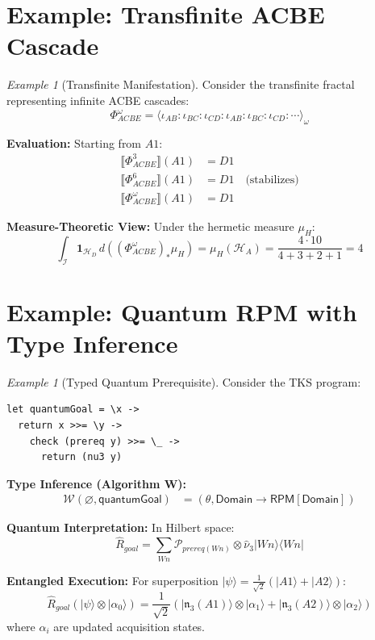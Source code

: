 \documentclass[11pt,twoside,openright]{book}
\theoremstyle{definition}
\theoremstyle{plain}
\theoremstyle{remark}
\newtheorem{example}[definition]{Example}
\newcommand{\sem}[1]{\llbracket #1 \rrbracket}
\newcommand{\Ideas}{\mathcal{I}}
\newcommand{\Hspace}{\mathcal{H}}
\newcommand{\qket}[1]{|#1\rangle}
\newcommand{\qbra}[1]{\langle #1|}
\newcommand{\qop}[1]{\hat{#1}}
\newcommand{\TransFrac}[1]{\Phi^{#1}}        %
\newcommand{\intI}{\int_{\Ideas}}            %
\newcommand{\Subst}{\theta}                  %
\newcommand{\AlgW}{\mathcal{W}}              %
\newcommand{\Projector}{\mathcal{P}}         %
\begin{document}
\section{Example: Transfinite ACBE Cascade}

\begin{example}[Transfinite Manifestation]
\label{ex:transfinite-manifest}
Consider the transfinite fractal representing infinite ACBE cascades:
\[
\TransFrac{\omega}_{ACBE} = \langle \iota_{AB} : \iota_{BC} : \iota_{CD} : \iota_{AB} : \iota_{BC} : \iota_{CD} : \cdots \rangle_\omega
\]

\textbf{Evaluation:} Starting from $A1$:
\begin{align}
\sem{\TransFrac{3}_{ACBE}}(A1) &= D1 \\
\sem{\TransFrac{6}_{ACBE}}(A1) &= D1 \quad \text{(stabilizes)} \\
\sem{\TransFrac{\omega}_{ACBE}}(A1) &= D1
\end{align}

\textbf{Measure-Theoretic View:} Under the hermetic measure $\mu_H$:
\[
\intI \mathbf{1}_{\Hspace_D} \, d((\TransFrac{\omega}_{ACBE})_* \mu_H) = \mu_H(\Hspace_A) = \frac{4 \cdot 10}{4 + 3 + 2 + 1} = 4
\]
\end{example}

\section{Example: Quantum RPM with Type Inference}

\begin{example}[Typed Quantum Prerequisite]
\label{ex:typed-quantum-rpm}
Consider the TKS program:
\begin{verbatim}
let quantumGoal = \x ->
  return x >>= \y ->
    check (prereq y) >>= \_ ->
      return (nu3 y)
\end{verbatim}

\textbf{Type Inference (Algorithm W):}
\begin{align}
\AlgW(\varnothing, \mathsf{quantumGoal}) &= (\Subst, \mathsf{Domain} \to \mathsf{RPM}[\mathsf{Domain}])
\end{align}

\textbf{Quantum Interpretation:} In Hilbert space:
\[
\qop{R}_{goal} = \sum_{Wn} \Projector_{prereq(Wn)} \otimes \qop{\nu}_3 \qket{Wn}\qbra{Wn}
\]

\textbf{Entangled Execution:} For superposition $\qket{\psi} = \frac{1}{\sqrt{2}}(\qket{A1} + \qket{A2})$:
\[
\qop{R}_{goal}(\qket{\psi} \otimes \qket{\alpha_0}) = \frac{1}{\sqrt{2}}(\qket{\mathfrak{n}_3(A1)} \otimes \qket{\alpha_1} + \qket{\mathfrak{n}_3(A2)} \otimes \qket{\alpha_2})
\]
where $\alpha_i$ are updated acquisition states.
\end{example}
\end{document}
